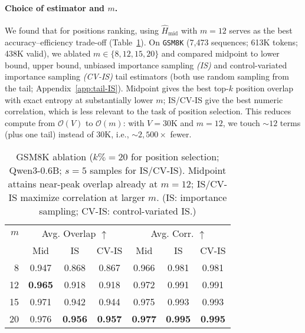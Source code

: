 \documentclass[11pt]{article}
\begin{document}
\paragraph{Choice of estimator and $m$.}
We found that for positions ranking, using $\widehat{H}_{\text{mid}}$ with $m{=}12$ serves as the best accuracy--efficiency trade-off (Table~\ref{tab:entropy-ablation}). On \texttt{GSM8K} (7{,}473 sequences; 613K tokens; 438K valid), we ablated $m\in\{8,12,15,20\}$ and compared midpoint to lower bound, upper bound, unbiased importance sampling \emph{(IS)} and control-variated importance sampling \emph{(CV-IS)} tail estimators (both use random sampling from the tail; Appendix~\ref{app:tail-IS}).
Midpoint gives the best top-$k$ position overlap with exact entropy at substantially lower $m$; IS/CV-IS give the best numeric correlation, which is less relevant to the task of position selection. This reduces compute from $\mathcal{O}(V)$ to $\mathcal{O}(m)$: with $V{=}30$K and $m{=}12$, we touch $\sim\!12$ terms (plus one tail) instead of 30K, i.e., $\sim\!2{,}500\times$ fewer.

\vspace{-0.5em}
\begin{table}[h]
	\centering
	\small
	\setlength{\tabcolsep}{6pt}
	\begin{tabular}{rcccccc}
		\toprule
		$m$ & \multicolumn{3}{c}{Avg. Overlap $\uparrow$} & \multicolumn{3}{c}{Avg. Corr. $\uparrow$}                                                                     \\
		\cmidrule(lr){2-4}\cmidrule(lr){5-7}
		    & Mid                                         & IS                                        & CV-IS          & Mid            & IS             & CV-IS          \\
		\midrule
		8   & 0.947                                       & 0.868                                     & 0.867          & 0.966          & 0.981          & 0.981          \\
		12  & \textbf{0.965}                              & 0.918                                     & 0.918          & 0.972          & 0.991          & 0.991          \\
		15  & 0.971                                       & 0.942                                     & 0.944          & 0.975          & 0.993          & 0.993          \\
		20  & 0.976                                       & \textbf{0.956}                            & \textbf{0.957} & \textbf{0.977} & \textbf{0.995} & \textbf{0.995} \\
		\bottomrule
	\end{tabular}
	\caption{GSM8K ablation ($k\%{=}20$ for position selection; Qwen3-0.6B; $s{=}5$ samples for IS/CV-IS). Midpoint attains near-peak overlap already at $m{=}12$; IS/CV-IS maximize correlation at larger $m$. (IS: importance sampling; CV-IS: control-variated IS.)}
	\label{tab:entropy-ablation}
\end{table}
\vspace{-0.75em}
\end{document}
